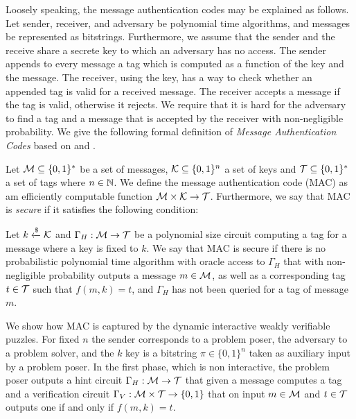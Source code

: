 Loosely speaking, the message authentication codes may be explained as follows.
Let sender, receiver, and adversary be polynomial time algorithms, and messages be represented as bitstrings.
Furthermore, we assume that the sender and the receive share a secrete key to which an adversary has no access.
The sender appends to every message a tag which is computed as a function of the key and the message.
The receiver, using the key, has a way to check whether an appended tag is valid for a received message.
The receiver accepts a message if the tag is valid, otherwise it rejects.
We require that it is hard for the adversary to find a tag and a message that is accepted by the receiver with non-negligible probability.
We give the following formal definition of \textit{Message Authentication Codes} based on \cite{LectureNotesCrypo} and \cite{Goldreich:2004:FCV:975541}.
\begin{definition}
  Let $\mathcal{M} \subseteq \{0,1\}^*$ be a set of messages, $\mathcal{K} \subseteq \{0,1\}^{n}$ a set of keys and $\mathcal{T} \subseteq \{0,1\}^*$ a set of tags where $n \in \mathbb{N}$.
  We define the \textnormal{message authentication code (MAC)} as am efficiently computable function $\mathcal{M} \times \mathcal{K} \rightarrow \mathcal{T}$.
  Furthermore, we say that MAC is \textit{secure} if it satisfies the following condition:

  Let $k \xleftarrow{\$} \mathcal{K}$ and $\Gamma_H: \mathcal{M} \rightarrow \mathcal{T}$ be a polynomial size circuit computing
  a tag for a message where a key is fixed to $k$. We say that MAC is secure if there is no probabilistic polynomial time algorithm with oracle access to $\Gamma_H$
  that with non-negligible probability outputs a message $m \in \mathcal{M}$, as well as a corresponding tag $t \in \mathcal{T}$ such that $f(m, k) = t$,
  and $\Gamma_H$ has not been queried for a tag of message $m$.

\end{definition}
%
We show how MAC is captured by the dynamic interactive weakly verifiable puzzles.
For fixed $n$ the sender corresponds to a problem poser, the adversary to a problem solver, and
the $k$ key is a bitstring $\pi \in \{0,1\}^{n}$ taken as auxiliary input by a problem poser.
In the first phase, which is non interactive, the problem poser outputs a hint circuit
$\Gamma_H: \mathcal{M} \rightarrow \mathcal{T}$ that given a message computes a tag
and a verification circuit $\Gamma_V: \mathcal{M} \times \mathcal{T} \rightarrow \{0,1\}$ that on input $m \in \mathcal{M}$ and $t \in \mathcal{T}$
outputs one if and only if $f(m, k) = t$.

